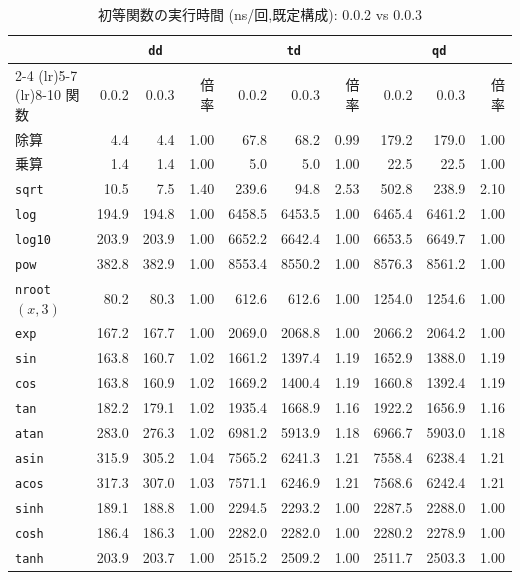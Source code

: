 \documentclass[a4paper,10pt]{ltjsarticle}
\begin{document}
\begin{table}[htbp]
\centering
\caption{初等関数の実行時間 (ns/回,既定構成): 0.0.2 vs 0.0.3}
\label{tab:elem23}
\small
\begin{tabular}{l rrr rrr rrr}
\toprule
 & \multicolumn{3}{c}{\texttt{dd}} & \multicolumn{3}{c}{\texttt{td}} & \multicolumn{3}{c}{\texttt{qd}} \\
\cmidrule(lr){2-4} \cmidrule(lr){5-7} \cmidrule(lr){8-10}
関数 & 0.0.2 & 0.0.3 & 倍率 & 0.0.2 & 0.0.3 & 倍率 & 0.0.2 & 0.0.3 & 倍率 \\
\midrule
除算 & 4.4 & 4.4 & 1.00 & 67.8 & 68.2 & 0.99 & 179.2 & 179.0 & 1.00 \\
乗算 & 1.4 & 1.4 & 1.00 & 5.0 & 5.0 & 1.00 & 22.5 & 22.5 & 1.00 \\
\texttt{sqrt} & 10.5 & 7.5 & 1.40 & 239.6 & 94.8 & 2.53 & 502.8 & 238.9 & 2.10 \\
\texttt{log} & 194.9 & 194.8 & 1.00 & 6458.5 & 6453.5 & 1.00 & 6465.4 & 6461.2 & 1.00 \\
\texttt{log10} & 203.9 & 203.9 & 1.00 & 6652.2 & 6642.4 & 1.00 & 6653.5 & 6649.7 & 1.00 \\
\texttt{pow} & 382.8 & 382.9 & 1.00 & 8553.4 & 8550.2 & 1.00 & 8576.3 & 8561.2 & 1.00 \\
\texttt{nroot}$(x,3)$ & 80.2 & 80.3 & 1.00 & 612.6 & 612.6 & 1.00 & 1254.0 & 1254.6 & 1.00 \\
\texttt{exp} & 167.2 & 167.7 & 1.00 & 2069.0 & 2068.8 & 1.00 & 2066.2 & 2064.2 & 1.00 \\
\texttt{sin} & 163.8 & 160.7 & 1.02 & 1661.2 & 1397.4 & 1.19 & 1652.9 & 1388.0 & 1.19 \\
\texttt{cos} & 163.8 & 160.9 & 1.02 & 1669.2 & 1400.4 & 1.19 & 1660.8 & 1392.4 & 1.19 \\
\texttt{tan} & 182.2 & 179.1 & 1.02 & 1935.4 & 1668.9 & 1.16 & 1922.2 & 1656.9 & 1.16 \\
\texttt{atan} & 283.0 & 276.3 & 1.02 & 6981.2 & 5913.9 & 1.18 & 6966.7 & 5903.0 & 1.18 \\
\texttt{asin} & 315.9 & 305.2 & 1.04 & 7565.2 & 6241.3 & 1.21 & 7558.4 & 6238.4 & 1.21 \\
\texttt{acos} & 317.3 & 307.0 & 1.03 & 7571.1 & 6246.9 & 1.21 & 7568.6 & 6242.4 & 1.21 \\
\texttt{sinh} & 189.1 & 188.8 & 1.00 & 2294.5 & 2293.2 & 1.00 & 2287.5 & 2288.0 & 1.00 \\
\texttt{cosh} & 186.4 & 186.3 & 1.00 & 2282.0 & 2282.0 & 1.00 & 2280.2 & 2278.9 & 1.00 \\
\texttt{tanh} & 203.9 & 203.7 & 1.00 & 2515.2 & 2509.2 & 1.00 & 2511.7 & 2503.3 & 1.00 \\
\bottomrule
\end{tabular}
\end{table}
\end{document}
